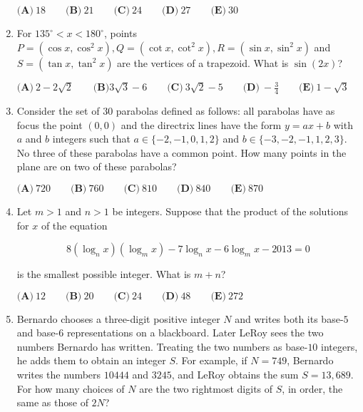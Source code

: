 \documentclass{article}
\begin{document}
\begin{enumerate}[label=\arabic*., itemsep=0.5em]
\( \textbf{(A)}\ 18\qquad\textbf{(B)}\ 21\qquad\textbf{(C)}\ 24\qquad\textbf{(D)}\ 27\qquad\textbf{(E)}\ 30 \)\par \vspace{0.5em}\item For \(135^\circ < x < 180^\circ\), points \(P=(\cos x, \cos^2 x), Q=(\cot x, \cot^2 x), R=(\sin x, \sin^2 x)\) and \(S =(\tan x, \tan^2 x)\) are the vertices of a trapezoid. What is \(\sin(2x)\)?

\( \textbf{(A)}\ 2-2\sqrt{2}\qquad\textbf{(B)} 3\sqrt{3}-6\qquad\textbf{(C)}\ 3\sqrt{2}-5\qquad\textbf{(D)}\ -\frac{3}{4}\qquad\textbf{(E)}\ 1-\sqrt{3}\)\par \vspace{0.5em}\item Consider the set of \(30\) parabolas defined as follows: all parabolas have as focus the point \((0,0)\) and the directrix lines have the form \(y=ax+b\) with \(a\) and \(b\) integers such that \(a\in \{-2,-1,0,1,2\}\) and \(b\in \{-3,-2,-1,1,2,3\}\). No three of these parabolas have a common point. How many points in the plane are on two of these parabolas?

\( \textbf{(A)}\ 720\qquad\textbf{(B)}\ 760\qquad\textbf{(C)}\ 810\qquad\textbf{(D)}\ 840\qquad\textbf{(E)}\ 870 \)\par \vspace{0.5em}\item Let \(m>1\) and \(n>1\) be integers. Suppose that the product of the solutions for \(x\) of the equation

\begin{equation*}
8(\log_n x)(\log_m x)-7\log_n x-6 \log_m x-2013 = 0
\end{equation*}

is the smallest possible integer. What is \(m+n\)?

\( \textbf{(A)}\ 12\qquad\textbf{(B)}\ 20\qquad\textbf{(C)}\ 24\qquad\textbf{(D)}\ 48\qquad\textbf{(E)}\ 272 \)\par \vspace{0.5em}\item Bernardo chooses a three-digit positive integer \(N\) and writes both its base-\(5\) and base-\(6\) representations on a blackboard. Later LeRoy sees the two numbers Bernardo has written. Treating the two numbers as base-\(10\) integers, he adds them to obtain an integer \(S\). For example, if \(N=749\), Bernardo writes the numbers \(10444\) and \(3245\), and LeRoy obtains the sum \(S=13,689\). For how many choices of \(N\) are the two rightmost digits of \(S\), in order, the same as those of \(2N\)?


\end{enumerate}
\end{document}
